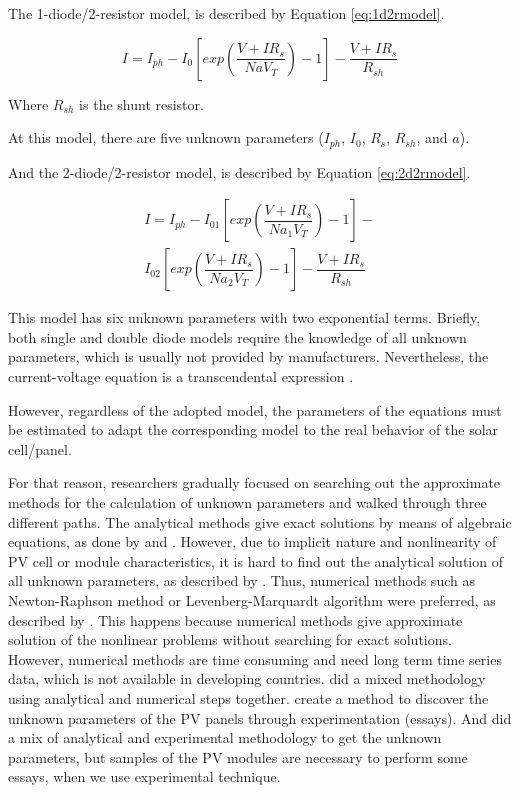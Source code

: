 \documentclass[journal]{IEEEtran}
\begin{document}
The 1-diode/2-resistor model, is described by Equation \ref{eq:1d2rmodel}. 

\begin{equation}
\label{eq:1d2rmodel}
I =I_{ph}-I_{0}\left[ exp \left( \dfrac{V+IR_{s}}{NaV_{T}} \right) -1 \right] - \dfrac{V+IR_{s}}{R_{sh}}
\end{equation}

Where $R_{sh}$ is the shunt resistor.

At this model, there are five unknown parameters ($ I_{ph}$, $I_{0}$, $ R_{s} $, $ R_{sh} $, and $ a $).

And the 2-diode/2-resistor model, is described by Equation \ref{eq:2d2rmodel}. 

\begin{multline}
\label{eq:2d2rmodel}
I =I_{ph}-I_{01}\left[ exp \left( \dfrac{V+IR_{s}}{Na_{1}V_{T}} \right) -1 \right] - \\ I_{02}\left[ exp \left( \dfrac{V+IR_{s}}{Na_{2}V_{T}} \right) -1 \right] - \dfrac{V+IR_{s}}{R_{sh}}
\end{multline}

This model has six unknown parameters with two exponential terms. 
Briefly, both single and double diode models require the knowledge of all unknown parameters, which is usually not provided by manufacturers. Nevertheless, the current-voltage equation is a transcendental expression \cite{Jakhrani}.  

However, regardless of the adopted model, the parameters of the equations must be estimated to adapt the corresponding model to the real behavior of the solar cell/panel. 

For that reason, researchers gradually focused on searching out the approximate methods for the calculation of unknown parameters and walked through three different paths. The analytical methods give exact solutions by means of algebraic equations, as done by \cite{Cubas} and \cite{Brano}. However, due to implicit nature and nonlinearity of PV cell or module characteristics, it is hard to find out the analytical solution of all unknown parameters, as described by \cite{Hasan}. Thus, numerical methods such as Newton-Raphson method or Levenberg-Marquardt algorithm were preferred, as described by \cite{Mellit}. This happens because numerical methods give approximate solution of the nonlinear problems without searching for exact solutions. However, numerical methods are time consuming and need long term time series data, which is not available in developing countries. \cite{Jakhrani} did a mixed methodology using analytical and numerical steps together.  \cite{Shenawy} create a method to discover the unknown parameters of the PV panels through experimentation (essays). And \cite{Tian} did a mix of analytical and experimental methodology to get the unknown parameters, but samples of the PV modules are necessary to perform some essays, when we use experimental technique. 
\end{document}
